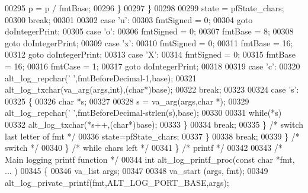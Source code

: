 \begin{DoxyCode}
{{{00295                   p = p / fmtBase;
00296                   \}
00297                 \}
00298 
00299               state = pfState\_chars;
00300               \textcolor{keywordflow}{break};
00301 
00302             \textcolor{keywordflow}{case} \textcolor{charliteral}{'u'}:
00303               fmtSigned = 0;
00304               \textcolor{keywordflow}{goto} doIntegerPrint;
00305             \textcolor{keywordflow}{case} \textcolor{charliteral}{'o'}:
00306               fmtSigned = 0;
00307               fmtBase = 8;
00308               \textcolor{keywordflow}{goto} doIntegerPrint;
00309             \textcolor{keywordflow}{case} \textcolor{charliteral}{'x'}:
00310               fmtSigned = 0;
00311               fmtBase = 16;
00312               \textcolor{keywordflow}{goto} doIntegerPrint;
00313             \textcolor{keywordflow}{case} \textcolor{charliteral}{'X'}:
00314               fmtSigned = 0;
00315               fmtBase = 16;
00316               fmtCase = 1;
00317               \textcolor{keywordflow}{goto} doIntegerPrint;
00318 
00319             \textcolor{keywordflow}{case} \textcolor{charliteral}{'c'}:
00320               alt\_log\_repchar(\textcolor{charliteral}{' '},fmtBeforeDecimal-1,base);
00321               alt\_log\_txchar(va\_arg(args,\textcolor{keywordtype}{int}),(\textcolor{keywordtype}{char}*)base);
00322               \textcolor{keywordflow}{break};
00323 
00324             \textcolor{keywordflow}{case} \textcolor{charliteral}{'s'}:
00325                 \{
00326                 \textcolor{keywordtype}{char} *s;
00327 
00328                 s = va\_arg(args,\textcolor{keywordtype}{char} *);
00329                 alt\_log\_repchar(\textcolor{charliteral}{' '},fmtBeforeDecimal-strlen(s),base);
00330 
00331                 \textcolor{keywordflow}{while}(*s)
00332                   alt\_log\_txchar(*s++,(\textcolor{keywordtype}{char}*)base);
00333                 \}
00334               \textcolor{keywordflow}{break};
00335             \} \textcolor{comment}{/* switch last letter of fmt */}
00336           state=pfState\_chars;
00337           \}
00338         \textcolor{keywordflow}{break};
00339       \} \textcolor{comment}{/* switch */}
00340     \} \textcolor{comment}{/* while chars left */}
00341   \} \textcolor{comment}{/* printf */}
00342 
00343 \textcolor{comment}{/* Main logging printf function */}
00344 \textcolor{keywordtype}{int} alt\_log\_printf\_proc(\textcolor{keyword}{const} \textcolor{keywordtype}{char} *fmt, ... )
00345 \{
00346     va\_list args;
00347 
00348     va\_start (args, fmt);
00349     alt\_log\_private\_printf(fmt,ALT_LOG_PORT_BASE,args);
}}}
\end{DoxyCode}
